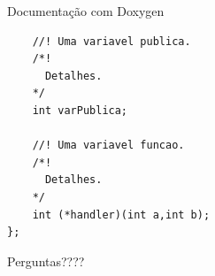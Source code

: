 \documentclass[12pt,table,xcolor={dvipsnames}]{beamer}
\begin{document}
\begin{frame}[fragile]{Documentação com Doxygen}
\begin{lstlisting}
    //! Uma variavel publica.
    /*!
      Detalhes.
    */
    int varPublica;
 
    //! Uma variavel funcao.
    /*!
      Detalhes.
    */
    int (*handler)(int a,int b);
};
\end{lstlisting}
\end{frame}

{
\begin{frame}

{\LARGE Perguntas????}

\end{frame}
}
\end{document}
